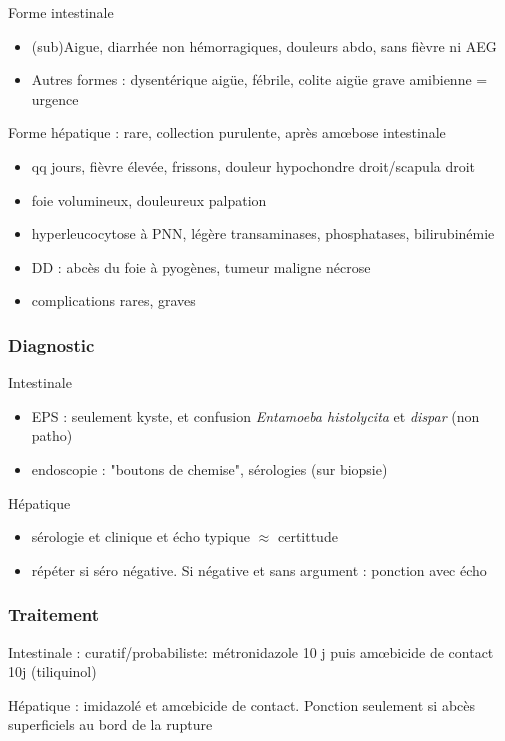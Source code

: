 \documentclass[11pt]{article}
\begin{document}
Forme intestinale 
\begin{itemize}
\item (sub)Aigue, diarrhée non hémorragiques, douleurs abdo, sans fièvre ni AEG
\item Autres formes : dysentérique aigüe, fébrile, colite aigüe grave amibienne
= urgence 
\end{itemize}

Forme hépatique : rare, collection purulente, après am\oe{}bose intestinale
\begin{itemize}
\item qq jours, fièvre élevée, frissons, douleur hypochondre droit/scapula droit
\item foie volumineux, douleureux palpation
\item hyperleucocytose à PNN, légère \inc{} transaminases, phosphatases,
bilirubinémie
\item DD : abcès du foie à pyogènes, tumeur maligne nécrose
\item complications rares, graves
\end{itemize}

\subsubsection{Diagnostic}
\label{sec:org1f0e171}
Intestinale
\begin{itemize}
\item EPS : seulement kyste, et confusion \emph{Entamoeba histolycita} et \emph{dispar} (non
patho)
\item endoscopie : "boutons de chemise", sérologies (sur biopsie)
\end{itemize}
Hépatique
\begin{itemize}
\item sérologie et clinique et écho typique \(\approx\) certittude
\item répéter si séro négative. Si négative et sans argument : ponction avec écho
\end{itemize}

\subsubsection{Traitement}
\label{sec:org88e1b52}
Intestinale : curatif/probabiliste: métronidazole 10 j puis am\oe{}bicide de
contact 10j (tiliquinol)

Hépatique : imidazolé et am\oe{}bicide de contact. Ponction seulement si abcès superficiels au bord
de la rupture
\end{document}
